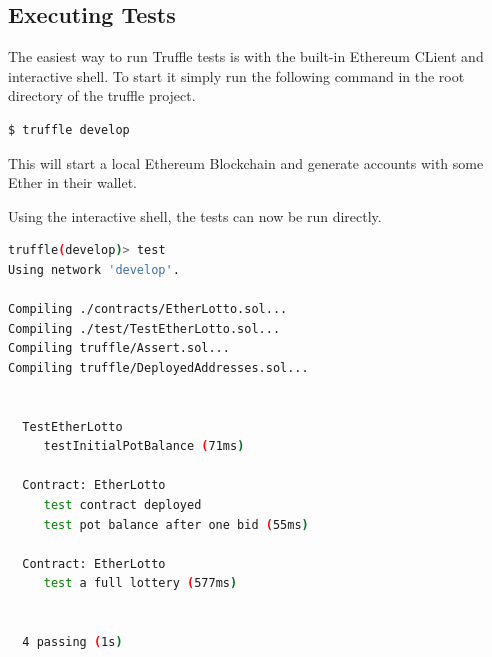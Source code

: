 \subsection{Executing Tests}\label{sec:execTests}

The easiest way to run Truffle tests is with the built-in Ethereum CLient and interactive shell. To start it simply run the following command in the root directory of the truffle project.
\begin{lstlisting}[language=bash]
$ truffle develop
\end{lstlisting}
This will start a local Ethereum Blockchain and generate accounts with some Ether in their wallet.

Using the interactive shell, the tests can now be run directly.
\begin{lstlisting}[language=bash]
truffle(develop)> test
Using network 'develop'.

Compiling ./contracts/EtherLotto.sol...
Compiling ./test/TestEtherLotto.sol...
Compiling truffle/Assert.sol...
Compiling truffle/DeployedAddresses.sol...


  TestEtherLotto
     testInitialPotBalance (71ms)

  Contract: EtherLotto
     test contract deployed
     test pot balance after one bid (55ms)

  Contract: EtherLotto
     test a full lottery (577ms)


  4 passing (1s)
\end{lstlisting}




\chapterend

